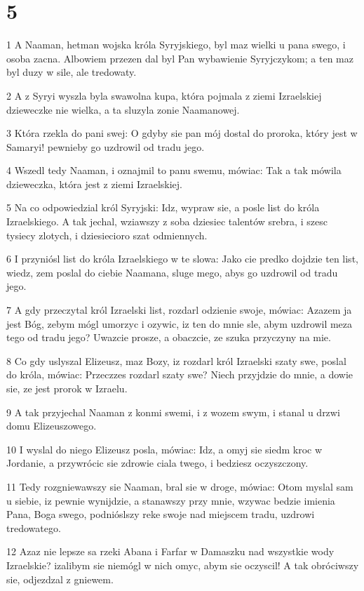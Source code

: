 \chapter{5}

\par 1 A Naaman, hetman wojska króla Syryjskiego, byl maz wielki u pana swego, i osoba zacna. Albowiem przezen dal byl Pan wybawienie Syryjczykom; a ten maz byl duzy w sile, ale tredowaty.
\par 2 A z Syryi wyszla byla swawolna kupa, która pojmala z ziemi Izraelskiej dzieweczke nie wielka, a ta sluzyla zonie Naamanowej.
\par 3 Która rzekla do pani swej: O gdyby sie pan mój dostal do proroka, który jest w Samaryi! pewnieby go uzdrowil od tradu jego.
\par 4 Wszedl tedy Naaman, i oznajmil to panu swemu, mówiac: Tak a tak mówila dzieweczka, która jest z ziemi Izraelskiej.
\par 5 Na co odpowiedzial król Syryjski: Idz, wypraw sie, a posle list do króla Izraelskiego. A tak jechal, wziawszy z soba dziesiec talentów srebra, i szesc tysiecy zlotych, i dziesiecioro szat odmiennych.
\par 6 I przyniósl list do króla Izraelskiego w te slowa: Jako cie predko dojdzie ten list, wiedz, zem poslal do ciebie Naamana, sluge mego, abys go uzdrowil od tradu jego.
\par 7 A gdy przeczytal król Izraelski list, rozdarl odzienie swoje, mówiac: Azazem ja jest Bóg, zebym mógl umorzyc i ozywic, iz ten do mnie sle, abym uzdrowil meza tego od tradu jego? Uwazcie prosze, a obaczcie, ze szuka przyczyny na mie.
\par 8 Co gdy uslyszal Elizeusz, maz Bozy, iz rozdarl król Izraelski szaty swe, poslal do króla, mówiac: Przeczzes rozdarl szaty swe? Niech przyjdzie do mnie, a dowie sie, ze jest prorok w Izraelu.
\par 9 A tak przyjechal Naaman z konmi swemi, i z wozem swym, i stanal u drzwi domu Elizeuszowego.
\par 10 I wyslal do niego Elizeusz posla, mówiac: Idz, a omyj sie siedm kroc w Jordanie, a przywrócic sie zdrowie ciala twego, i bedziesz oczyszczony.
\par 11 Tedy rozgniewawszy sie Naaman, bral sie w droge, mówiac: Otom myslal sam u siebie, iz pewnie wynijdzie, a stanawszy przy mnie, wzywac bedzie imienia Pana, Boga swego, podnióslszy reke swoje nad miejscem tradu, uzdrowi tredowatego.
\par 12 Azaz nie lepsze sa rzeki Abana i Farfar w Damaszku nad wszystkie wody Izraelskie? izalibym sie niemógl w nich omyc, abym sie oczyscil! A tak obróciwszy sie, odjezdzal z gniewem.
